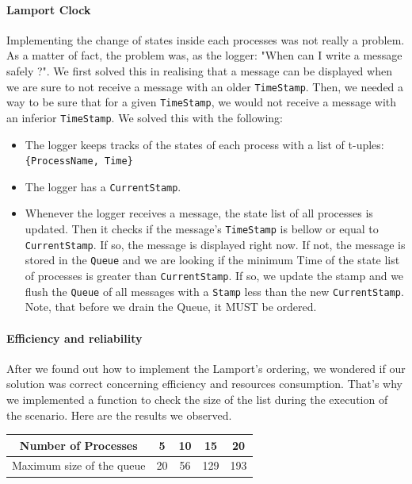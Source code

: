 \documentclass[a4paper, 11pt]{article}
\begin{document}
\paragraph{Lamport Clock}
Implementing the change of states inside each processes was not really a problem. As a matter of fact, the problem was, as the logger: "When can I write a message safely ?". We first solved this in realising that a message can be displayed when we are sure to not receive a message with an older \lstinline!TimeStamp!. Then, we needed a way to be sure that for a given \lstinline!TimeStamp!, we would not receive a message with an inferior \lstinline!TimeStamp!. We solved this with the following:
\begin{itemize}
\item The logger keeps tracks of the states of each process with a list of t-uples: \lstinline!{ProcessName, Time}!
\item The logger has a \lstinline!CurrentStamp!.
\item Whenever the logger receives a message, the state list of all processes is updated. Then it checks if the message's \lstinline!TimeStamp! is bellow or equal to \lstinline!CurrentStamp!. If so, the message is displayed right now. If not, the message is stored in the \lstinline!Queue! and we are looking if the minimum Time of the state list of processes is greater than \lstinline!CurrentStamp!. If so, we update the stamp and we flush the \lstinline!Queue! of all messages with a \lstinline!Stamp! less than the new \lstinline!CurrentStamp!. Note, that before we drain the Queue, it MUST be ordered.
\end{itemize}

\paragraph{Efficiency and reliability}
After we found out how to implement the Lamport's ordering, we wondered if our solution was correct concerning efficiency and resources consumption. That's why we implemented a function to check the size of the list during the execution of the scenario.
Here are the results we observed.\\

\begin{center}
\begin{tabular}{|c|c|c|c|c|}
\hline 
Number of Processes & 5 & 10 & 15 & 20 \\ 
\hline 
Maximum size of the queue & 20 & 56 & 129 & 193 \\ 
\hline 
\end{tabular} 
\end{center}
\end{document}
